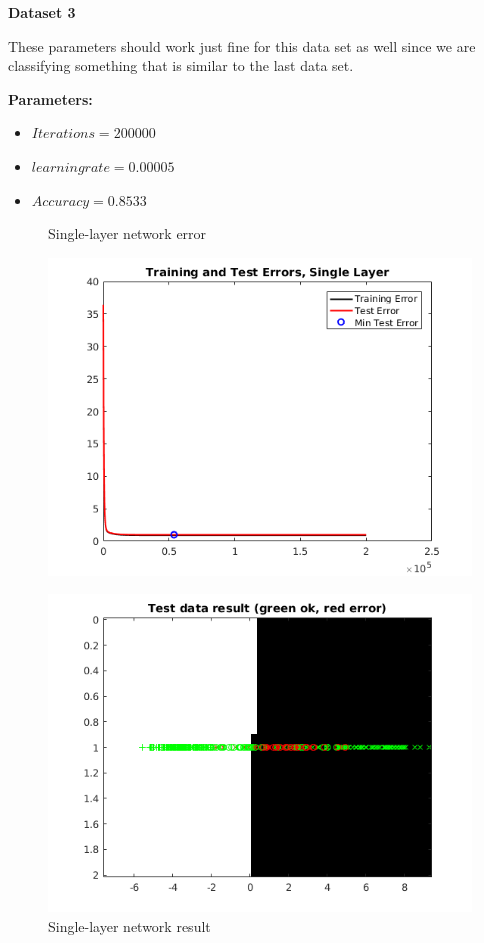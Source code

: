 \documentclass[a4paper,12pt]{article}
\begin{document}
\noindent \textbf{Dataset 3}

These parameters should work just fine for this data set as well since we are classifying something that is similar to the last data set.

\textbf{Parameters:}
\begin{itemize}
\item $Iterations = 200000$
\item $learning rate = 0.00005$
\item $Accuracy = 0.8533$
\end{itemize}

\begin{figure}[H]
\centering
  \begin{minipage}[]{0.49\textwidth}
  \caption{Single-layer network error}\label{fig:single_3_error}
  \includegraphics[width=\textwidth]{figures/single_3_error.png}
  \end{minipage}
  \begin{minipage}[]{0.49\textwidth}
  \caption{Single-layer network result}\label{fig:single_3_test}
  \includegraphics[width=\textwidth]{figures/single_3_test.png}
  \end{minipage}
\end{figure}
\end{document}
